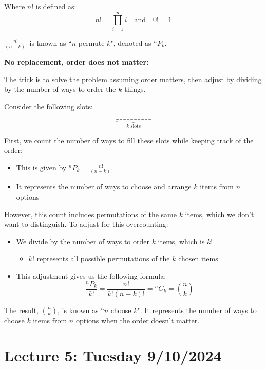 \documentclass{article}
\begin{document}
Where $n!$ is defined as:
\[
    n! = \prod_{i=1}^{n} i \quad \text{and} \quad 0! = 1
\]

\vspace{0.3cm}

\noindent
$\frac{n!}{(n-k)!}$ is known as ``$n$ permute $k$", denoted as ${}^nP_k$.

\vspace{0.5cm}

\noindent
\textbf{No replacement, order does not matter:}

\noindent
The trick is to solve the problem assuming order matters, then adjust by dividing by the number of ways to order the $k$ things.

\vspace{0.3cm}

\noindent
Consider the following slots:

\[
\underbrace{\_\,\_\,\_\,\_\,\_\,\_\,\_\,\_\,\_\,\_}_{k\text{ slots}}
\]

\noindent
First, we count the number of ways to fill these slots while keeping track of the order:
\begin{itemize}
    \item This is given by ${}^nP_k = \frac{n!}{(n-k)!}$
    \item It represents the number of ways to choose and arrange $k$ items from $n$ options
\end{itemize}

However, this count includes permutations of the same $k$ items, which we don't want to distinguish. To adjust for this overcounting:
\begin{itemize}
    \item We divide by the number of ways to order $k$ items, which is $k!$
        \begin{itemize}
            \item $k!$ represents all possible permutations of the $k$ chosen items
        \end{itemize}
    \item This adjustment gives us the following formula:
        \[ \frac{{}^nP_k}{k!} = \frac{n!}{k!(n-k)!} = {}^nC_k = \binom{n}{k} \]
\end{itemize}

The result, $\binom{n}{k}$, is known as ``$n$ choose $k$". It represents the number of ways to choose $k$ items from $n$ options when the order doesn't matter.

\pagebreak

\section*{Lecture 5: Tuesday 9/10/2024}
\end{document}
